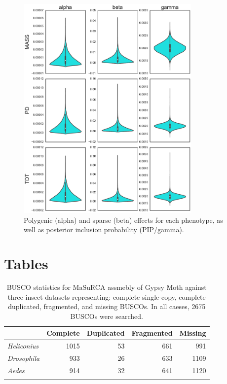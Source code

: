 \documentclass[smallextended]{svjour3}
\begin{document}
\begin{figure}[ht]
\centering
\includegraphics[width=0.8\textwidth]{gemma_effect}
\caption{Polygenic (alpha) and sparse (beta) effects for each phenotype, as well 
as posterior inclusion probability (PIP/gamma).}
\label{fig:gemma_effect}
\end{figure}
\clearpage

\section*{Tables}
\begin{longtable}[]{@{}lrrrr@{}}
\caption{BUSCO statistics for MaSuRCA assmebly of Gypsy Moth against three insect 
datasets representing: complete single-copy, complete duplicated, fragmented, and 
missing BUSCOs. In all caeses, \num{2675} BUSCOs were searched.}\\
\toprule
& Complete & Duplicated & Fragmented & Missing\tabularnewline
\midrule
\endhead
\textit{Heliconius} & 1015 & 53 & 661 & 991\tabularnewline
\textit{Drosophila} & 933 & 26 & 633 & 1109\tabularnewline
\textit{Aedes} & 914 & 32 & 641 & 1120\tabularnewline
\bottomrule
\label{tab:busco}
\end{longtable}

\clearpage
\end{document}
